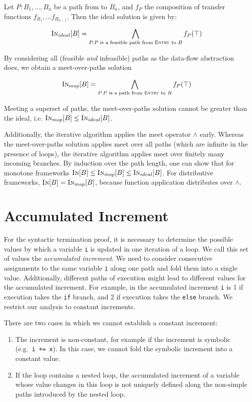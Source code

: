 Let $P: B_1, \dots, B_n$ be a path from \entry{} to $B_n$, and $f_P$ the composition of transfer functions $f_{B_1}, \dots f_{B_{n-1}}$. Then the ideal solution is given by:

\[
    \textsc{In}_{ideal}[B] = \bigwedge\limits_{P \ldotp P \text{ is a feasible path from \textsc{Entry}{}  to } B} f_P(\top)
\]

By considering all (feasible \emph{and} infeasible) paths as the data-flow abstraction does, we obtain a meet-over-paths solution

\[
    \textsc{In}_{mop}[B] = \bigwedge\limits_{P \ldotp P \text{ is a path from \textsc{Entry}{} to } B} f_P(\top)
\]

Meeting a superset of paths, the meet-over-paths solution cannot be greater than the ideal, i.e. $\textsc{In}_{mop}[B] \le \textsc{In}_{ideal}[B]$.

Additionally, the iterative algorithm applies the meet operator $\wedge$ early. Whereas the meet-over-paths solution applies meet over all paths (which are infinite in the presence of loops), the iterative algorithm applies meet over finitely many incoming branches. By induction over the path length, one can show that for monotone frameworks $\textsc{In}[B] \le \textsc{In}_{mop}[B] \le \textsc{In}_{ideal}[B]$. For distributive frameworks, $\textsc{In}[B] = \textsc{In}_{mop}[B]$, because function application distributes over $\wedge$.

\section{Accumulated Increment}
\label{sec:acc_inc}

For the syntactic termination proof, it is necessary to determine the possible values by which a variable \verb!i! is updated in one iteration of a loop. We call this set of values the \emph{accumulated increment}. We need to consider consecutive assignments to the same variable \verb!i! along one path and fold them into a single value. Additionally, different paths of execution might lead to different values for the accumulated increment. For example, in  the accumulated increment \verb!i! is 1 if execution takes the \verb!if! branch, and 2 if execution takes the \verb!else! branch. We restrict our analysis to constant increments.

There are two cases in which we cannot establish a constant increment:

\begin{enumerate}
    \item The increment is non-constant, for example if the increment is symbolic (e.g.\ \verb!i += x!). In this case, we cannot fold the symbolic increment into a constant value.
    \item If the loop contains a nested loop, the accumulated increment of a variable whose value changes in this loop is not uniquely defined along the non-simple paths introduced by the nested loop.
\end{enumerate}


